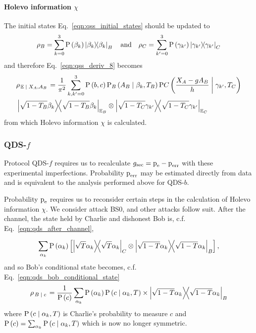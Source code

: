 \paragraph{Holevo information $\chi$}
The initial states Eq.~\ref{eqn:qss_initial_states} should be updated to
\begin{equation}
\rho_B = \sum_{k=0}^3 \text{P}\left(\beta_k\right) \dyad{\beta_k}_B \qq{and} \rho_C = \sum_{k^\prime=0}^3 \text{P}\left(\gamma_{k^\prime}\right) \dyad{\gamma_{k^\prime}}_C
\end{equation}
and therefore Eq.~\ref{eqn:qss_deriv_8} becomes
\begin{align}
&\rho_{\left.\mathbb{E} \given X_A, A_B\right.} = \frac{1}{\pi^2}\sum_{k, k^\prime=0}^3 \text{P}\left(b, c\right) \text{P}_B\left(A_B \given \beta_k, T_B\right) \text{P}C\left(\frac{X_A - g A_B}{h} \given \gamma_{k^\prime}, T_C\right) \notag \\
&\dyad{\sqrt{1-T_B}\beta_k}_{\mathbb{E}_B} \otimes \dyad{\sqrt{1-T_C} \gamma_{k^\prime}}_{\mathbb{E}_C}
\end{align}
from which Holevo information $\chi$ is calculated.

\subsubsection{QDS-$f$}
Protocol QDS-$f$ requires us to recalculate $g_{\text{sec}} = \text{p}_{\text{e}} - \text{p}_{\text{err}}$ with these experimental imperfections. Probability $\text{p}_{\text{err}}$ may be estimated directly from data and is equivalent to the analysis performed above for QDS-$b$.

Probability $\text{p}_{\text{e}}$ requires us to reconsider certain steps in the calculation of Holevo information $\chi$. We consider attack BS$0$, and other attacks follow suit. After the channel, the state held by Charlie and dishonest Bob is, c.f. Eq.~\ref{eqn:qds_after_channel},

\begin{equation}
\sum_{\alpha_k} \text{P}\left(\alpha_k\right)  \left[ \dyad{\sqrt{T}\alpha_k}_C \otimes \dyad{\sqrt{1-T}\alpha_k}_B\right],
\end{equation}
and so Bob's conditional state becomes, c.f. Eq.~\ref{eqn:qds_bob_conditional_state}
\begin{equation}
\rho_{\left.B \given c\right.} = \frac{1}{\text{P}\left(c\right)} \sum_{\alpha_k} \text{P}\left(\alpha_k\right) \text{P}\left(c \given \alpha_k, T\right) \times \dyad{\sqrt{1-T}\alpha_k}_B
\end{equation}
where $\text{P}\left(c \; \middle| \; \alpha_k, T\right)$ is Charlie's probability to measure $c$ and $\text{P}\left(c\right) = \sum_{\alpha_k}\text{P}\left(c \; \middle| \; \alpha_k, T\right)$ which is now no longer symmetric.


